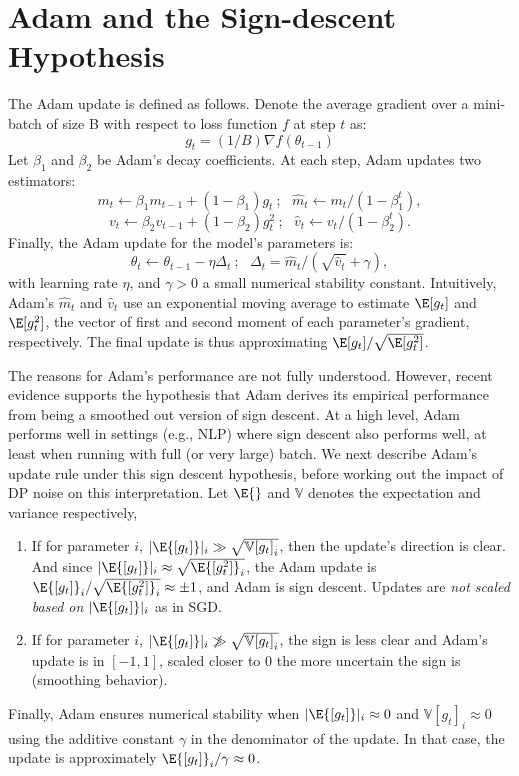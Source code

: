 \documentclass[letterpaper]{article} %
\def\V{\mathbb{V}}
\begin{document}
\section{Adam and the Sign-descent Hypothesis}
\label{sec:background}
The Adam update \citep{orig_adam} is defined as follows. Denote the average gradient over a mini-batch of size B with respect to loss function $f$ at step $t$ as:
\[
    g_t = (1/B)\nabla f(\theta_{t-1})
\]
Let $\beta_1$ and $\beta_2$ be Adam's decay coefficients. At each step, Adam updates two estimators:
\[
    m_{t} \leftarrow \beta_{1} m_{t-1} + \left(1-\beta_{1}\right) g_t \ ; \ \ \ \widehat{m}_{t} \leftarrow m_{t} /\left(1-\beta_{1}^{t}\right) ,
\]
\[
    v_{t} \leftarrow \beta_{2} v_{t-1}+\left(1-\beta_{2}\right) g_t^{2} \ ; \ \ \ \widehat{v}_{t} \leftarrow v_{t} /\left(1-\beta_{2}^{t}\right) .
\]
Finally, the Adam update for the model's parameters is:
\[
    \theta_t \leftarrow \theta_{t-1} - \eta \Delta_t \ ; \ \ \ \Delta_t = \hat{m}_t / (\sqrt{\hat{v}_t} + \gamma) ,
\]
with learning rate $\eta$, and $\gamma>0$ a small numerical stability constant.
Intuitively, Adam's $\hat{m}_t$ and $\hat{v}_t$ use an exponential moving average to estimate $\E[g_t]$ and $\E[g_t^2]$, the vector of first and second moment of each parameter's gradient, respectively. The final update is thus approximating $\E[g_t]/\sqrt{\E[g_t^2]}$.

The reasons for Adam's performance are not fully understood. However, recent evidence \citep{kunstner2023heavytailed} supports the hypothesis that Adam derives its empirical performance from being a smoothed out version of sign descent. At a high level, Adam performs well in settings (e.g., NLP) where sign descent also performs well, at least when running with full (or very large) batch.
We next describe Adam's update rule under this sign descent hypothesis, before working out the impact of DP noise on this interpretation. Let $\E{}$ and $\V{}$ denotes the expectation and variance respectively,
\begin{enumerate}
\item If for parameter $i$, $|\E{[g_t]}|_i \gg \sqrt{\V{[g_t]}_i}$, then the update's direction is clear. And since $|\E{[g_t]}|_i \approx \sqrt{\E{[g^2_t]}_i}$, the Adam update is $\E{[g_t]}_i / \sqrt{\E{[g^2_t]}_i} \approx \pm 1$, and Adam is sign descent. Updates are {\em not scaled based on $|\E{[g_t]}|_i$} as in SGD.
\item If for parameter $i$, $|\E{[g_t]}|_i \not\gg \sqrt{\V{[g_t]}_i}$, the sign is less clear and Adam's update is in $[-1, 1]$, scaled closer to $0$ the more uncertain the sign is (smoothing behavior).
\end{enumerate}
Finally, Adam ensures numerical stability when $|\E{[g_t]}|_i \approx 0$ and $\V{[g_t]}_i \approx 0$ using the additive constant $\gamma$ in the denominator of the update. In that case, the update is approximately $\E{[g_t]}_i/\gamma \approx 0$.
\end{document}
